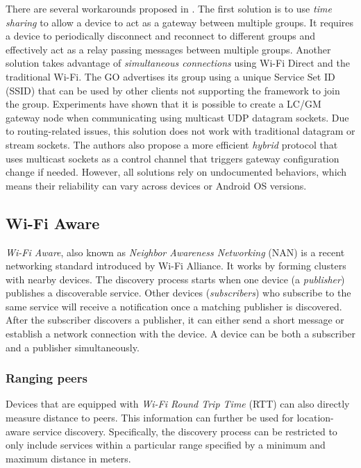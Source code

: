 \documentclass[conference,compsoc]{IEEEtran}
\begin{document}
There are several workarounds proposed in \cite{FunaiTH16}. The first solution is to use \textit{time sharing} to allow a device to act as a gateway between multiple groups. It requires a device to periodically disconnect and reconnect to different groups and effectively act as a relay passing messages between multiple groups.
Another solution takes advantage of \textit{simultaneous connections} using Wi-Fi Direct and the traditional Wi-Fi. The GO advertises its group using a unique Service Set ID (SSID) that can be used by other clients not supporting the framework to join the group. Experiments have shown that it is possible to create a LC/GM gateway node when communicating using multicast UDP datagram sockets. Due to routing-related issues, this solution does not work with traditional datagram or stream sockets. The authors also propose a more efficient \textit{hybrid} protocol that uses multicast sockets as a control channel that triggers gateway configuration change if needed. However, all solutions rely on undocumented behaviors, which means their reliability can vary across devices or Android OS versions.

\subsection{Wi-Fi Aware}

\textit{Wi-Fi Aware}, also known as \textit{Neighbor Awareness Networking} (NAN) is a recent networking standard introduced by Wi-Fi Alliance. \cite{wifiaware} It works by forming clusters with nearby devices. The discovery process starts when one device (a \textit{publisher}) publishes a discoverable service. Other devices (\textit{subscribers}) who subscribe to the same service will receive a notification once a matching publisher is discovered. After the subscriber discovers a publisher, it can either send a short message or establish a network connection with the device. A device can be both a subscriber and a publisher simultaneously.


\subsubsection{Ranging peers}

Devices that are equipped with \textit{Wi-Fi Round Trip Time} (RTT) can also directly measure distance to peers. This information can further be used for location-aware service discovery. Specifically, the discovery process can be restricted to only include services within a particular range specified by a minimum and maximum distance in meters.
\end{document}
